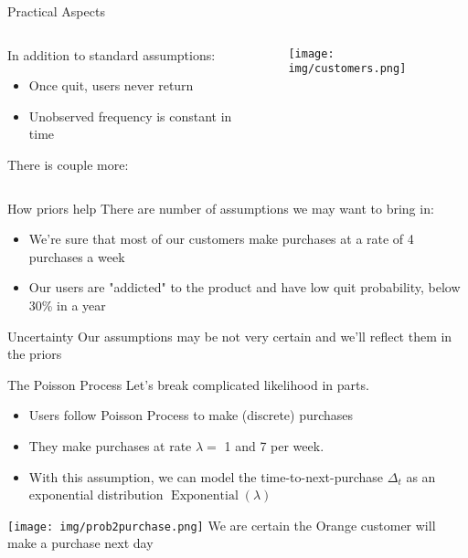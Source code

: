 \documentclass{beamer}
\begin{document}
\begin{frame}{Practical Aspects}
\begin{columns}
    \begin{column}{0.5\linewidth}
    In addition to standard assumptions:
    \begin{itemize}
        \item Once quit, users never return
        \item Unobserved frequency is constant in time
    \end{itemize}
    There is couple more:
    \end{column}
    \begin{column}{0.5\linewidth}
    \begin{figure}
        \centering
        \texttt{[image: img/customers.png]}
    \end{figure}
    \end{column}
\end{columns}
\end{frame}
\begin{frame}{How priors help}
    There are number of assumptions we may want to bring in:

    \begin{itemize}
        \item We’re sure that most of our customers make purchases at a rate of 4 purchases a week
        \item Our users are "addicted" to the product and have low quit probability, below 30\% in a year
    \end{itemize}
\begin{block}{Uncertainty}
    Our assumptions may be not very certain and we'll reflect them in the priors
\end{block}
\end{frame}
\begin{frame}{The Poisson Process}
Let's break complicated likelihood in parts.
\begin{itemize}
    \item Users follow Poisson Process to make (discrete) purchases
    \item They make purchases at rate $\lambda=$ 1 and 7 per week.
    \item With this assumption, we can model the time-to-next-purchase $\Delta_t$ as an exponential distribution $\operatorname{Exponential}(\lambda)$
\end{itemize}
\texttt{[image: img/prob2purchase.png]}
We are certain the Orange customer will make a purchase next day
\end{frame}
\end{document}

